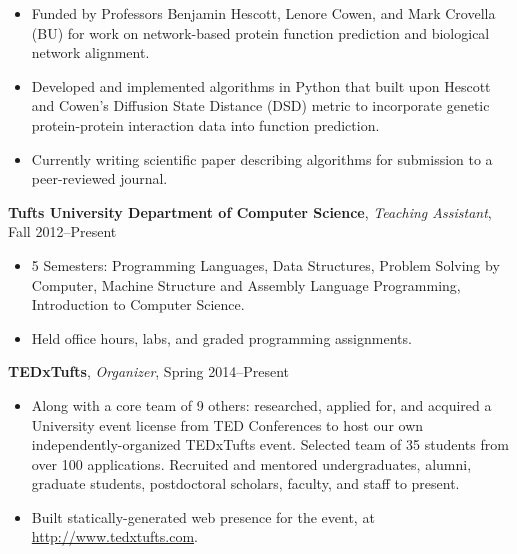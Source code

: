 \documentclass[10pt, letter]{article}
\begin{document}
\begin{itemize}[topsep=0pt,itemsep=-1pt]
    \item Funded by Professors Benjamin Hescott, Lenore Cowen, and Mark Crovella (BU) for work on network-based protein function prediction and biological network alignment.
    \item Developed and implemented algorithms in Python that built upon Hescott and Cowen's Diffusion State Distance (DSD) metric to incorporate genetic protein-protein interaction data into function prediction.
    \item Currently writing scientific paper describing algorithms for submission to a peer-reviewed journal.
\end{itemize}
\vspace{6pt}
{\bf Tufts University Department of Computer Science}, {\em Teaching Assistant}, Fall 2012--Present\\
\vspace*{-.15in}
\begin{itemize}[topsep=0pt,itemsep=-1pt]
  \item 5 Semesters: Programming Languages, Data Structures, Problem Solving by Computer, Machine Structure and Assembly Language Programming, Introduction to Computer Science.
  \item Held office hours, labs, and graded programming assignments.
\end{itemize}
\vspace{6pt}
{\bf TEDxTufts}, {\em Organizer}, Spring 2014--Present\\
\vspace*{-.15in}
\begin{itemize}[topsep=0pt, itemsep=1pt]
  \item Along with a core team of 9 others: researched, applied for, and acquired a University event license from TED Conferences to host our own independently-organized TEDxTufts event. Selected team of 35 students from over 100 applications. Recruited and mentored undergraduates, alumni, graduate students, postdoctoral scholars, faculty, and staff to present.
  \item Built statically-generated web presence for the event, at \url{http://www.tedxtufts.com}.
\end{itemize}
\end{document}
